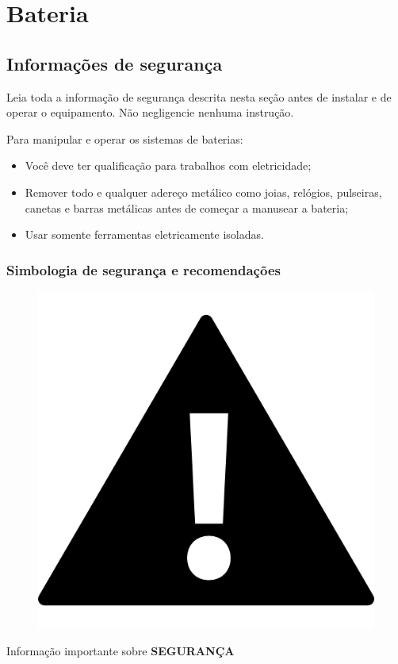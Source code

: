 \chapter{Bateria}

\section*{Informações de segurança}

Leia toda a informação de segurança descrita nesta seção antes de instalar e de operar o equipamento. Não negligencie nenhuma instrução.

Para manipular e operar os sistemas de baterias:

\begin{itemize}

    \item Você deve ter qualificação para trabalhos com eletricidade;
    \item Remover todo e qualquer adereço metálico como joias, relógios, pulseiras, canetas e
barras metálicas antes de começar a manusear a bateria;
    \item Usar somente ferramentas eletricamente isoladas.

\end{itemize}

\subsection*{Simbologia de segurança e recomendações}


\begin{center}
    \begin{figure}[H]
    \centering
		\includegraphics[scale=1.6]{Figuras/bateria/iconeimportante.png}
	    \label{iconeimportante}
    \end{figure} 
  
    	Informação importante sobre \textbf{SEGURANÇA}
 \end{center}   	
 
